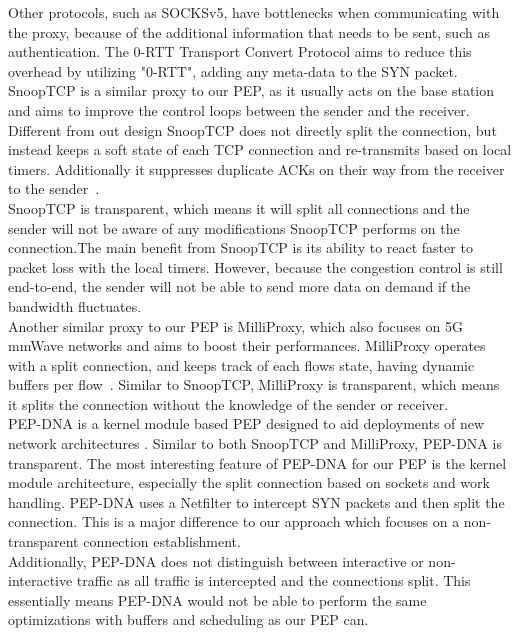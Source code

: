\documentclass[a4paper,english, 12pt]{report}
\begin{document}
Other protocols, such as SOCKSv5, have bottlenecks when communicating with the proxy, because of the additional information that needs to be sent, such as authentication. The 0-RTT Transport Convert Protocol aims to reduce this overhead by utilizing "0-RTT", adding any meta-data to the SYN packet.\\

SnoopTCP is a similar proxy to our PEP, as it usually acts on the base station and aims to improve the control loops between the sender and the receiver. Different from out design SnoopTCP does not directly split the connection, but instead keeps a soft state of each TCP connection and re-transmits based on local timers. Additionally it suppresses duplicate ACKs on their way from the receiver to the sender~\cite{snooptcp}.\\

SnoopTCP is transparent, which means it will split all connections and the sender will not be aware of any modifications SnoopTCP performs on the connection.The main benefit from SnoopTCP is its ability to react faster to packet loss with the local timers. However, because the congestion control is still end-to-end, the sender will not be able to send more data on demand if the bandwidth fluctuates.\\

Another similar proxy to our PEP is MilliProxy, which also focuses on 5G mmWave networks and aims to boost their performances. MilliProxy operates with a split connection, and keeps track of each flows state, having dynamic buffers per flow~\cite{milliproxy}. Similar to SnoopTCP, MilliProxy is transparent, which means it splits the connection without the knowledge of the sender or receiver.\\

PEP-DNA is a kernel module based PEP designed to aid deployments of new network architectures \cite{pep_dna}. Similar to both SnoopTCP and MilliProxy, PEP-DNA is transparent. The most interesting feature of PEP-DNA for our PEP is the kernel module architecture, especially the split connection based on sockets and work handling. PEP-DNA uses a Netfilter to intercept SYN packets and then split the connection. This is a major difference to our approach which focuses on a non-transparent connection establishment.\\

Additionally, PEP-DNA does not distinguish between interactive or non-interactive traffic as all traffic is intercepted and the connections split. This essentially means PEP-DNA would not be able to perform the same optimizations with buffers and scheduling as our PEP can.\\
\end{document}
